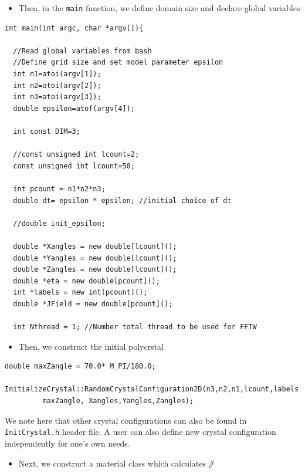 \documentclass[11pt]{article}
\begin{document}
\begin{itemize} \item Then, in the \texttt{main} function, we define domain size 
and declare global variables \end{itemize}

\begin{tcolorbox}
\begin{lstlisting}[basicstyle=\footnotesize]
int main(int argc, char *argv[]){

  //Read global variables from bash
  //Define grid size and set model parameter epsilon
  int n1=atoi(argv[1]);
  int n2=atoi(argv[2]);
  int n3=atoi(argv[3]);
  double epsilon=atof(argv[4]);

  int const DIM=3;
      
  //const unsigned int lcount=2;
  const unsigned int lcount=50;
    
  int pcount = n1*n2*n3;
  double dt= epsilon * epsilon; //initial choice of dt
	
  //double init_epsilon;
 
  double *Xangles = new double[lcount]();
  double *Yangles = new double[lcount]();
  double *Zangles = new double[lcount]();
  double *eta = new double[pcount]();
  int *labels = new int[pcount]();
  double *JField = new double[pcount]();

  int Nthread = 1; //Number total thread to be used for FFTW
\end{lstlisting}
\end{tcolorbox}


\begin{itemize} \item Then, we construct the initial polycrstal \end{itemize}

\begin{tcolorbox}
\begin{lstlisting}[basicstyle=\footnotesize]
  double maxZangle = 70.0* M_PI/180.0;
  InitializeCrystal::RandomCrystalConfiguration2D(n3,n2,n1,lcount,labels, 
         maxZangle, Xangles,Yangles,Zangles);
\end{lstlisting}
\end{tcolorbox}

We note here that other crystal configurations can also 
be found in \texttt{InitCrystal.h} header file.
A user can also define new crystal configuration 
independently for one's own needs.  

\begin{itemize} \item Next, we construct a material class which calculates $\mathcal{J}$ \end{itemize}
 
\end{document}
